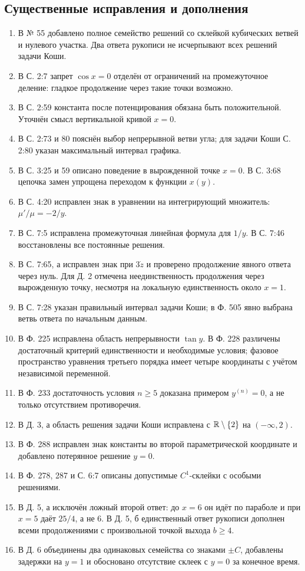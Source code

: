 \subsection*{Существенные исправления и дополнения}
\begin{enumerate}
\item В № 55 добавлено полное семейство решений со склейкой
кубических ветвей и нулевого участка. Два ответа рукописи не исчерпывают
всех решений задачи Коши.
\item В С. 2:7 запрет $\cos x=0$ отделён от ограничений на промежуточное
деление: гладкое продолжение через такие точки возможно.
\item В С. 2:59 константа после потенцирования обязана быть положительной.
Уточнён смысл вертикальной кривой $x=0$.
\item В С. 2:73 и 80 пояснён выбор непрерывной ветви угла;
для задачи Коши С. 2:80 указан максимальный интервал графика.
\item В С. 3:25 и 59 описано поведение в вырожденной точке $x=0$.
В С. 3:68 цепочка замен упрощена переходом к функции $x(y)$.
\item В С. 4:20 исправлен знак в уравнении на интегрирующий множитель:
$\mu'/\mu=-2/y$.
\item В С. 7:5 исправлена промежуточная линейная формула для $1/y$.
В С. 7:46 восстановлены все постоянные решения.
\item В С. 7:65, а исправлен знак при $3\dot z$ и проверено продолжение
явного ответа через нуль. Для Д. 2 отмечена неединственность продолжения
через вырожденную точку, несмотря на локальную единственность около $x=1$.
\item В С. 7:28 указан правильный интервал задачи Коши;
в Ф. 505 явно выбрана ветвь ответа по начальным данным.
\item В Ф. 225 исправлена область непрерывности $\tan y$.
В Ф. 228 различены достаточный критерий единственности и необходимые
условия; фазовое пространство уравнения третьего порядка имеет четыре координаты
с учётом независимой переменной.
\item В Ф. 233 достаточность условия $n\ge5$ доказана примером
$y^{(n)}=0$, а не только отсутствием противоречия.
\item В Д. 3, а область решения задачи Коши исправлена с
$\mathbb{R}\setminus\{2\}$ на $(-\infty,2)$.
\item В Ф. 288 исправлен знак константы во второй параметрической
координате и добавлено потерянное решение $y=0$.
\item В Ф. 278, 287 и С. 6:7 описаны допустимые $C^1$-склейки
с особыми решениями.
\item В Д. 5, а исключён ложный второй ответ: до $x=6$ он идёт
по параболе и при $x=5$ даёт $25/4$, а не $6$.
В Д. 5, б единственный ответ рукописи дополнен всеми продолжениями
с произвольной точкой выхода $b\ge4$.
\item В Д. 6 объединены два одинаковых семейства со знаками
$\pm C$, добавлены задержки на $y=1$ и обосновано отсутствие
склеек с $y=0$ за конечное время.
\end{enumerate}
